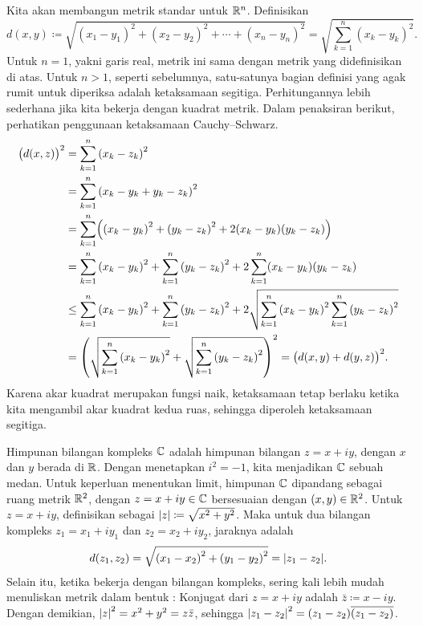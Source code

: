 \begin{example}
Kita akan membangun
metrik standar untuk ${\mathbb{R}}^n$.  Definisikan
\begin{equation*}
d(x,y) \coloneqq
\sqrt{
{(x_1-y_1)}^2 + 
{(x_2-y_2)}^2 + 
\cdots +
{(x_n-y_n)}^2
} =
\sqrt{
\sum_{k=1}^n
{(x_k-y_k)}^2 
} .
\end{equation*}
Untuk $n=1$, yakni garis real, metrik ini sama dengan metrik yang didefinisikan di atas.
Untuk $n > 1$,
seperti sebelumnya, satu-satunya bagian definisi yang agak rumit untuk diperiksa adalah ketaksamaan segitiga.
Perhitungannya lebih sederhana jika kita bekerja dengan kuadrat metrik.  Dalam
penaksiran berikut, perhatikan penggunaan ketaksamaan Cauchy--Schwarz.
\begin{equation*}
\begin{split}
{\bigl(d(x,z)\bigr)}^2 & =
\sum_{k=1}^n
{(x_k-z_k)}^2 
\\
& =
\sum_{k=1}^n
{(x_k-y_k+y_k-z_k)}^2 
\\
& =
\sum_{k=1}^n
\Bigl(
{(x_k-y_k)}^2+{(y_k-z_k)}^2 + 2(x_k-y_k)(y_k-z_k)
\Bigr)
\\
& =
\sum_{k=1}^n
{(x_k-y_k)}^2
+
\sum_{k=1}^n
{(y_k-z_k)}^2 
+
2
\sum_{k=1}^n
(x_k-y_k)(y_k-z_k)
\\
& \leq
\sum_{k=1}^n
{(x_k-y_k)}^2
+
\sum_{k=1}^n
{(y_k-z_k)}^2 
+
2
\sqrt{
\sum_{k=1}^n
{(x_k-y_k)}^2
\sum_{k=1}^n
{(y_k-z_k)}^2
}
\\
& =
{\left(
\sqrt{
\sum_{k=1}^n
{(x_k-y_k)}^2
}
+
\sqrt{
\sum_{k=1}^n
{(y_k-z_k)}^2 
}
\right)}^2
=
{\bigl( d(x,y) + d(y,z) \bigr)}^2 .
\end{split}
\end{equation*}
Karena akar kuadrat merupakan fungsi naik,
ketaksamaan tetap berlaku ketika kita 
mengambil akar kuadrat kedua ruas, sehingga diperoleh ketaksamaan segitiga.
\end{example}

\begin{example}
Himpunan bilangan kompleks ${\mathbb{C}}$ adalah himpunan bilangan $z = x+iy$, dengan $x$
dan $y$ berada di ${\mathbb{R}}$.  Dengan menetapkan $i^2 = -1$, kita menjadikan ${\mathbb{C}}$
sebuah medan.
Untuk keperluan menentukan limit,
himpunan ${\mathbb{C}}$ dipandang sebagai ruang metrik ${\mathbb{R}}^2$, dengan $z=x+iy \in {\mathbb{C}}$
bersesuaian dengan $(x,y) \in {\mathbb{R}}^2$.
Untuk $z=x+iy$, definisikan \emph{}
sebagai $\lvert {z} \rvert \coloneqq \sqrt{x^2+y^2}$.
Maka untuk dua bilangan kompleks
$z_1 = x_1 + iy_1$ dan $z_2 = x_2 + iy_2$, jaraknya adalah
\begin{equation*}
d(z_1,z_2) = \sqrt{{(x_1-x_2)}^2+ {(y_1-y_2)}^2} = \lvert {z_1-z_2} \rvert.
\end{equation*}
Selain itu, ketika bekerja dengan bilangan kompleks,
sering kali lebih mudah menuliskan metrik dalam bentuk
\emph{}: Konjugat dari $z=x+iy$
adalah $\bar{z} \coloneqq x-iy$.  Dengan demikian,
${\lvert {z} \rvert}^2 = x^2 +y^2 = z\bar{z}$, sehingga ${\lvert {z_1-z_2} \rvert}^2 =
(z_1-z_2)\overline{(z_1-z_2)}$.
\end{example}

